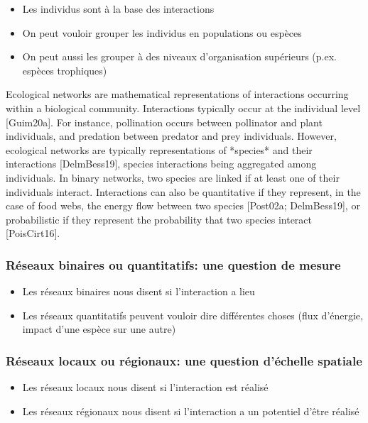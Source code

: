 \begin{itemize}
    \item Les individus sont à la base des interactions
    \item On peut vouloir grouper les individus en populations ou espèces
    \item On peut aussi les grouper à des niveaux d'organisation supérieurs (p.ex. espèces trophiques)
\end{itemize}

Ecological networks are mathematical representations of interactions occurring
within a biological community. Interactions typically occur at the individual
level [Guim20a]. For instance, pollination occurs between pollinator and plant
individuals, and predation between predator and prey individuals. However,
ecological networks are typically representations of *species* and their
interactions [DelmBess19], species interactions being aggregated among
individuals. In binary networks, two species are linked if at least one of their
individuals interact. Interactions can also be quantitative if they represent,
in the case of food webs, the energy flow between two species [Post02a;
DelmBess19], or probabilistic if they represent the probability that two
species interact [PoisCirt16].

\subsubsection{Réseaux binaires ou quantitatifs: une question de mesure} 

\begin{itemize}
    \item Les réseaux binaires nous disent si l'interaction a lieu
    \item Les réseaux quantitatifs peuvent vouloir dire différentes choses (flux d'énergie, impact d'une espèce sur une autre)
\end{itemize}

\subsubsection{Réseaux locaux ou régionaux: une question d'échelle spatiale} 

\begin{itemize}
    \item Les réseaux locaux nous disent si l'interaction est réalisé 
    \item Les réseaux régionaux nous disent si l'interaction a un potentiel d'être réalisé
\end{itemize}

